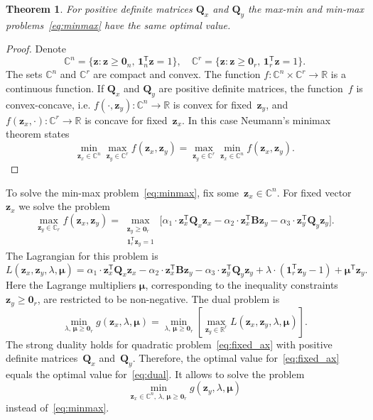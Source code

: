 \documentclass[12pt,oneside]{article}
\newtheorem{theorem}{Theorem}
\theoremstyle{definition}
\newcommand{\bz}{\mathbf{z}}
\newcommand{\bB}{\mathbf{B}}
\newcommand{\bQ}{\mathbf{Q}}
\newcommand{\bbR}{\mathbb{R}}
\newcommand{\T}{\mathsf{T}}
\newcommand{\bmu}{\boldsymbol{\mu}}
\newcommand{\bOne}{\boldsymbol{1}}
\newcommand{\bZero}{\boldsymbol{0}}
\begin{document}
\begin{theorem}
	For positive definite matrices $\bQ_x$ and $\bQ_y$ the max-min and min-max problems~\eqref{eq:minmax} have the same optimal value.
\end{theorem}
\begin{proof}
	Denote
	\begin{equation}
	\mathbb{C}^n = \{\bz : \bz \geq \bZero_n, \, \bOne_n^{\T}\bz=1\}, \quad \mathbb{C}^r = \{\bz : \bz \geq \bZero_r, \, \bOne_r^{\T}\bz=1\}.
	\end{equation}
	The sets $\mathbb{C}^n$ and $\mathbb{C}^r$ are compact and convex. The function $f: \mathbb{C}^n \times \mathbb{C}^r \rightarrow \bbR$ is a continuous function. If $\bQ_x$ and $\bQ_y$ are positive definite matrices, the function~$f$ is convex-concave, i.e.
	$f(\cdot, \bz_y): \mathbb{C}^n \rightarrow \bbR$ is convex for fixed~$\bz_y$, and $f(\bz_x, \cdot): \mathbb{C}^r \rightarrow \bbR$ is concave for fixed~$\bz_x$.
	In this case Neumann's minimax theorem states
	\begin{equation}
	\min_{\bz_x \in \mathbb{C}^n} \max_{\bz_y \in \mathbb{C}^r} f(\bz_x, \bz_y) = \max_{\bz_y \in \mathbb{C}^r} \min_{\bz_x\in \mathbb{C}^n} f(\bz_x, \bz_y).
	\end{equation}
\end{proof}

To solve the min-max problem~\eqref{eq:minmax}, fix some~$\bz_x \in \mathbb{C}^n$. For fixed vector~$\bz_x$ we solve the problem
\begin{equation}
	\max_{\bz_y \in \mathbb{C}_r} f(\bz_x, \bz_y) = \max_{\substack{\bz_y \geq \bZero_r \\ \bOne_r^{\T}\bz_y=1}} \bigl[\alpha_1 \cdot \bz_x^{\T} \bQ_x \bz_x - \alpha_2 \cdot \bz_x^{\T} \bB \bz_y - \alpha_3 \cdot \bz_y^{\T} \bQ_y \bz_y \bigr].
	\label{eq:fixed_ax}
\end{equation}
The Lagrangian for this problem is
\begin{equation}
	L(\bz_x, \bz_y, \lambda, \bmu) = \alpha_1 \cdot \bz_x^{\T} \bQ_x \bz_x - \alpha_2 \cdot \bz_x^{\T} \bB \bz_y - \alpha_3 \cdot \bz_y^{\T} \bQ_y \bz_y + \lambda \cdot  (\bOne_r^{\T} \bz_y - 1) + \bmu^{\T} \bz_y.
\end{equation}
Here the Lagrange multipliers $\bmu$, corresponding to the inequality constraints $\bz_y \geq \bZero_r$, are restricted to be non-negative.
The dual problem is
\begin{equation}
	\min_{\lambda, \, \bmu \geq \bZero_r} g(\bz_x, \lambda, \bmu) = \min_{\lambda, \, \bmu \geq \bZero_r}  \left[\max_{\bz_y \in \bbR^r} L(\bz_x, \bz_y, \lambda, \bmu) \right].
	\label{eq:dual}
\end{equation}
The strong duality holds for quadratic problem~\eqref{eq:fixed_ax} with positive definite matrices~$\bQ_x$ and~$\bQ_y$. Therefore, the optimal value for~\eqref{eq:fixed_ax} equals the optimal value for~\eqref{eq:dual}. It allows to solve the problem
\begin{equation}
	\min_{\bz_x \in \mathbb{C}^n, \, \lambda, \, \bmu \geq \bZero_r} g(\bz_y, \lambda, \bmu)
	\label{eq:dual_maxmin}
\end{equation}
instead of~\eqref{eq:minmax}.
\end{document}
